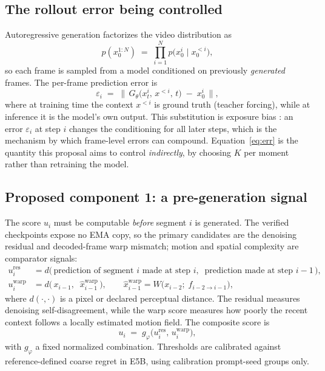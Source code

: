 \documentclass[11pt,a4paper]{article}
\begin{document}
\subsection{The rollout error being controlled}

Autoregressive generation factorizes the video distribution as
\begin{equation}
p(x_0^{1:N}) \;=\; \prod_{i=1}^{N} p\bigl(x_0^{i} \mid x_0^{<i}\bigr),
\label{eq:ar}
\end{equation}
so each frame is sampled from a model conditioned on previously \emph{generated} frames. The per-frame prediction error is
\begin{equation}
\varepsilon_i \;=\; \bigl\|\, G_\theta\bigl(x_t^{i},\, x^{<i},\, t\bigr) \;-\; x_0^{i} \,\bigr\|,
\label{eq:err}
\end{equation}
where at training time the context $x^{<i}$ is ground truth (teacher forcing), while at inference it is the model's own output. This substitution is exposure bias \parencite{huangSelfForcingBridging2025}: an error $\varepsilon_i$ at step $i$ changes the conditioning for all later steps, which is the mechanism by which frame-level errors can compound. Equation~\eqref{eq:err} is the quantity this proposal aims to control \emph{indirectly}, by choosing $K$ per moment rather than retraining the model.

\subsection{Proposed component 1: a pre-generation signal}

The score $u_i$ must be computable \emph{before} segment $i$ is generated. The verified checkpoints expose no EMA copy, so the primary candidates are the denoising residual and decoded-frame warp mismatch; motion and spatial complexity are comparator signals:
\begin{align}
u_i^{\mathrm{res}} &= d\bigl(\,\text{prediction of segment } i \text{ made at step } i,\;\; \text{prediction made at step } i-1 \,\bigr), \label{eq:ures}\\[2pt]
u_i^{\mathrm{warp}} &= d\bigl(\,x_{i-1},\;\; \hat{x}_{i-1}^{\mathrm{warp}}\,\bigr), \qquad \hat{x}_{i-1}^{\mathrm{warp}} = W\bigl(x_{i-2};\; f_{i-2\to i-1}\bigr), \label{eq:uwarp}
\end{align}
where $d(\cdot,\cdot)$ is a pixel or declared perceptual distance. The residual measures denoising self-disagreement, while the warp score measures how poorly the recent context follows a locally estimated motion field. The composite score is
\begin{equation}
u_i \;=\; g_\varphi\bigl(u_i^{\mathrm{res}},\, u_i^{\mathrm{warp}}\bigr),
\label{eq:ucmp}
\end{equation}
with $g_\varphi$ a fixed normalized combination. Thresholds are calibrated against reference-defined coarse regret in E5B, using calibration prompt-seed groups only.
\end{document}
